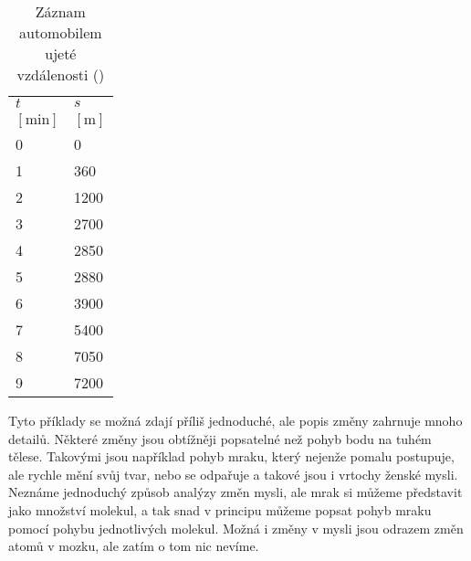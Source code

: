     \begin{wraptable}[23]{r}{4cm}      %
      \centering
      \renewcommand{\arraystretch}{1.4}
      \begin{tabular}{>{\centering\arraybackslash}p{3em}|>{\centering\arraybackslash}p{3em}}
         \hline \(t\)     & \(s\)          \\
         \([\text{min}]\) & \([\text{m}]\) \\
         \hline   \num{0} & \num{0}        \\
                  \num{1} & \num{360}      \\
                  \num{2} & \num{1200}     \\
                  \num{3} & \num{2700}     \\
                  \num{4} & \num{2850}     \\
                  \num{5} & \num{2880}     \\
                  \num{6} & \num{3900}     \\
                  \num{7} & \num{5400}     \\
                  \num{8} & \num{7050}     \\
                  \num{9} & \num{7200}     \\
         \hline 
      \end{tabular}
      \caption{Záznam automobilem ujeté vzdálenosti (\cite[s.~109]{Feynman01})}
      \label{fyz:tab002}
    \end{wraptable}
    Tyto příklady se možná zdají příliš jednoduché, ale popis změny zahrnuje mnoho detailů. Některé 
    změny jsou obtížněji popsatelné než pohyb bodu na tuhém tělese. Takovými jsou například pohyb 
    mraku, který nejenže pomalu postupuje, ale rychle mění svůj tvar, nebo se odpařuje a takové 
    jsou i vrtochy ženské mysli. Neznáme jednoduchý způsob analýzy změn mysli, ale mrak si můžeme 
    představit jako množství molekul, a tak snad v principu můžeme popsat pohyb mraku pomocí pohybu 
    jednotlivých molekul. Možná i změny v mysli jsou odrazem změn atomů v mozku, ale zatím o tom 
    nic nevíme.

